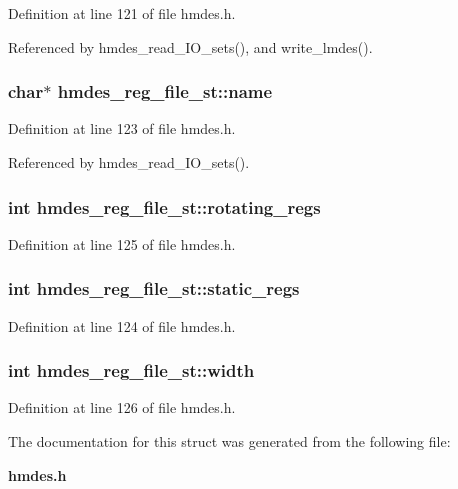 Definition at line 121 of file hmdes.h.

Referenced by hmdes\_\-read\_\-IO\_\-sets(), and write\_\-lmdes().
\subsubsection{\setlength{\rightskip}{0pt plus 5cm}char$\ast$ \bf{hmdes\_\-reg\_\-file\_\-st::name}}\label{structhmdes__reg__file__st_22d8bf4afc93e6fcbf72a6ff44f0bb3f}




Definition at line 123 of file hmdes.h.

Referenced by hmdes\_\-read\_\-IO\_\-sets().
\subsubsection{\setlength{\rightskip}{0pt plus 5cm}int \bf{hmdes\_\-reg\_\-file\_\-st::rotating\_\-regs}}\label{structhmdes__reg__file__st_8c76be89048197ce4272dba4a1be1700}




Definition at line 125 of file hmdes.h.
\subsubsection{\setlength{\rightskip}{0pt plus 5cm}int \bf{hmdes\_\-reg\_\-file\_\-st::static\_\-regs}}\label{structhmdes__reg__file__st_de80fa78d15397acbb223216e5e05163}




Definition at line 124 of file hmdes.h.
\subsubsection{\setlength{\rightskip}{0pt plus 5cm}int \bf{hmdes\_\-reg\_\-file\_\-st::width}}\label{structhmdes__reg__file__st_c65674ca370b99fbfd21e32a0f26fa0a}




Definition at line 126 of file hmdes.h.

The documentation for this struct was generated from the following file:\begin{CompactItemize}
\item 
\bf{hmdes.h}\end{CompactItemize}

